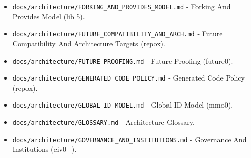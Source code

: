 \documentclass[9pt,a4paper,openany]{book}
\begin{document}
\begin{itemize}
\item \texttt{docs/\allowbreak{}architecture/\allowbreak{}FORKING\_\allowbreak{}AND\_\allowbreak{}PROVIDES\_\allowbreak{}MODEL.\allowbreak{}md} -\allowbreak{} Forking And Provides Model (lib 5).\allowbreak{}
\end{itemize}

\begin{itemize}
\item \texttt{docs/\allowbreak{}architecture/\allowbreak{}FUTURE\_\allowbreak{}COMPATIBILITY\_\allowbreak{}AND\_\allowbreak{}ARCH.\allowbreak{}md} -\allowbreak{} Future Compatibility And Architecture Targets (repox).\allowbreak{}
\end{itemize}

\begin{itemize}
\item \texttt{docs/\allowbreak{}architecture/\allowbreak{}FUTURE\_\allowbreak{}PROOFING.\allowbreak{}md} -\allowbreak{} Future Proofing (future0).\allowbreak{}
\end{itemize}

\begin{itemize}
\item \texttt{docs/\allowbreak{}architecture/\allowbreak{}GENERATED\_\allowbreak{}CODE\_\allowbreak{}POLICY.\allowbreak{}md} -\allowbreak{} Generated Code Policy (repox).\allowbreak{}
\end{itemize}

\begin{itemize}
\item \texttt{docs/\allowbreak{}architecture/\allowbreak{}GLOBAL\_\allowbreak{}ID\_\allowbreak{}MODEL.\allowbreak{}md} -\allowbreak{} Global ID Model (mmo0).\allowbreak{}
\end{itemize}

\begin{itemize}
\item \texttt{docs/\allowbreak{}architecture/\allowbreak{}GLOSSARY.\allowbreak{}md} -\allowbreak{} Architecture Glossary.\allowbreak{}
\end{itemize}

\begin{itemize}
\item \texttt{docs/\allowbreak{}architecture/\allowbreak{}GOVERNANCE\_\allowbreak{}AND\_\allowbreak{}INSTITUTIONS.\allowbreak{}md} -\allowbreak{} Governance And Institutions (civ0+).\allowbreak{}
\end{itemize}
\end{document}
